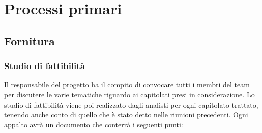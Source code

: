 \section{Processi primari}
\subsection{Fornitura}
\subsubsection{Studio di fattibilità}

Il responsabile del progetto ha il compito di convocare tutti i membri del team per discutere le varie tematiche riguardo ai capitolati presi in considerazione.
Lo studio di fattibilità viene poi realizzato dagli analisti per ogni capitolato trattato, tenendo anche conto di quello che è stato detto nelle riunioni precedenti. Ogni appalto avrà un documento che conterrà i seguenti punti:

